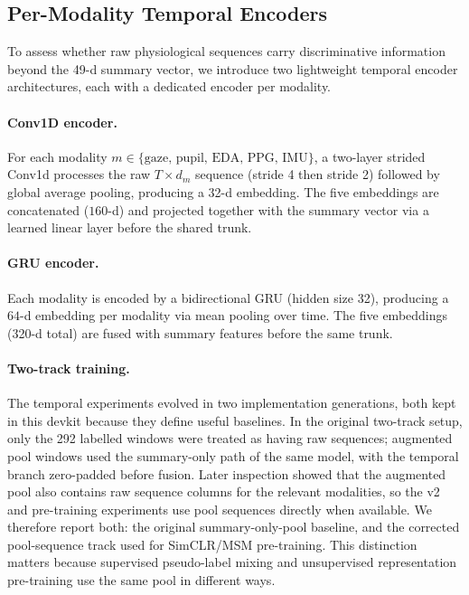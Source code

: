 \documentclass[sigconf,review,anonymous]{acmart}
\begin{document}
\subsection{Per-Modality Temporal Encoders}
\label{sec:temporal_encoders}

To assess whether raw physiological sequences carry discriminative information
beyond the 49-d summary vector, we introduce two lightweight temporal encoder
architectures, each with a dedicated encoder per modality.

\paragraph{Conv1D encoder.}
For each modality $m \in \{\text{gaze, pupil, EDA, PPG, IMU}\}$, a two-layer
strided Conv1d processes the raw $T{\times}d_m$ sequence
(stride 4 then stride 2) followed by global average pooling,
producing a 32-d embedding.
The five embeddings are concatenated ($160$-d) and projected together
with the summary vector via a learned linear layer before the shared trunk.

\paragraph{GRU encoder.}
Each modality is encoded by a bidirectional GRU (hidden size 32),
producing a $64$-d embedding per modality via mean pooling over time.
The five embeddings (320-d total) are fused with summary features
before the same trunk.

\paragraph{Two-track training.}
The temporal experiments evolved in two implementation generations, both kept
in this devkit because they define useful baselines.
In the original two-track setup, only the 292 labelled windows were treated as
having raw sequences; augmented pool windows used the summary-only path of the
same model, with the temporal branch zero-padded before fusion.
Later inspection showed that the augmented pool also contains raw sequence
columns for the relevant modalities, so the v2 and pre-training experiments
use pool sequences directly when available.
We therefore report both: the original summary-only-pool baseline, and the
corrected pool-sequence track used for SimCLR/MSM pre-training.
This distinction matters because supervised pseudo-label mixing and
unsupervised representation pre-training use the same pool in different ways.
\end{document}
